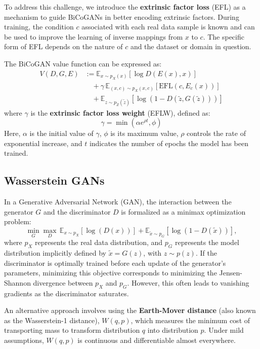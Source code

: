 To address this challenge, we introduce the
\textbf{extrinsic factor loss} (EFL) as a mechanism to guide BiCoGANs
in better encoding extrinsic factors. During training, the condition
\( c \) associated with each real data sample is known and can be used to
improve the learning of inverse mappings from \( x \) to \( c \).
The specific form of EFL depends on the nature of \( c \) and the dataset
or domain in question.

The BiCoGAN value function can be expressed as:
\begin{equation}
\begin{aligned}
V(D, G, E) &:= \mathbb{E}_{x \sim p_X(x)} [\log D(E(x), x)]\\
&\quad + \gamma \, \mathbb{E}_{(x, c) \sim p_X(x, c)} [\text{EFL}(c, E_c(x))] \\
&\quad +\mathbb{E}_{z \sim p_{\tilde{Z}} (\tilde{z})} [\log (1 - D(\tilde{z}, G(\tilde{z})))]
\end{aligned}
\end{equation}
where \( \gamma \) is the \textbf{extrinsic factor loss weight} (EFLW),
defined as:
\[
\gamma = \min(\alpha e^{\rho t}, \phi)
\]
Here, \( \alpha \) is the initial value of \( \gamma \), \( \phi \)
is its maximum value, \( \rho \) controls the rate of exponential increase,
and \( t \) indicates the number of epochs the model has been trained.

\subsection{Wasserstein GANs}
\label{sec:wgan}

In a Generative Adversarial Network (GAN),
the interaction between the generator \( G \) and the discriminator
\( D \) is formalized as a minimax optimization problem:
\begin{equation}
\min_G \max_D \, \mathbb{E}_{x \sim p_X}[\log(D(x))] + \mathbb{E}_{\tilde{x} \sim p_G}[\log(1 - D(\tilde{x}))],
\end{equation}
where \( p_X \) represents the real data distribution,
and \( p_G \) represents the model distribution implicitly defined by
\(\tilde{x} = G(z)\), with \( z \sim p(z) \). If the discriminator
is optimally trained before each update of the generator's parameters,
minimizing this objective corresponds to minimizing the
Jensen-Shannon divergence between \( p_X \) and \( p_G \).
However, this often leads to vanishing gradients as the discriminator saturates.

An alternative approach involves using the \textbf{Earth-Mover distance}
(also known as the Wasserstein-1 distance),
\( W(q, p) \), which measures the minimum cost of transporting mass
to transform distribution \( q \) into distribution \( p \).
Under mild assumptions, \( W(q, p) \) is continuous and differentiable
almost everywhere.

